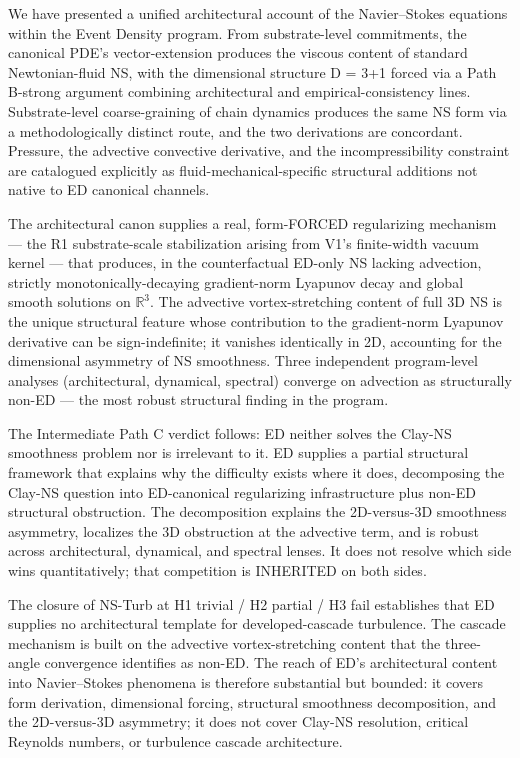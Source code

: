 \documentclass[
]{article}
\begin{document}
We have presented a unified architectural account of the Navier--Stokes
equations within the Event Density program. From substrate-level
commitments, the canonical PDE's vector-extension produces the viscous
content of standard Newtonian-fluid NS, with the dimensional structure D
= 3+1 forced via a Path B-strong argument combining architectural and
empirical-consistency lines. Substrate-level coarse-graining of chain
dynamics produces the same NS form via a methodologically distinct
route, and the two derivations are concordant. Pressure, the advective
convective derivative, and the incompressibility constraint are
catalogued explicitly as fluid-mechanical-specific structural additions
not native to ED canonical channels.

The architectural canon supplies a real, form-FORCED regularizing
mechanism --- the R1 substrate-scale stabilization arising from V1's
finite-width vacuum kernel --- that produces, in the counterfactual
ED-only NS lacking advection, strictly monotonically-decaying
gradient-norm Lyapunov decay and global smooth solutions on
\(\mathbb{R}^3\). The advective vortex-stretching content of full 3D NS
is the unique structural feature whose contribution to the gradient-norm
Lyapunov derivative can be sign-indefinite; it vanishes identically in
2D, accounting for the dimensional asymmetry of NS smoothness. Three
independent program-level analyses (architectural, dynamical, spectral)
converge on advection as structurally non-ED --- the most robust
structural finding in the program.

The Intermediate Path C verdict follows: ED neither solves the Clay-NS
smoothness problem nor is irrelevant to it. ED supplies a partial
structural framework that explains why the difficulty exists where it
does, decomposing the Clay-NS question into ED-canonical regularizing
infrastructure plus non-ED structural obstruction. The decomposition
explains the 2D-versus-3D smoothness asymmetry, localizes the 3D
obstruction at the advective term, and is robust across architectural,
dynamical, and spectral lenses. It does not resolve which side wins
quantitatively; that competition is INHERITED on both sides.

The closure of NS-Turb at H1 trivial / H2 partial / H3 fail establishes
that ED supplies no architectural template for developed-cascade
turbulence. The cascade mechanism is built on the advective
vortex-stretching content that the three-angle convergence identifies as
non-ED. The reach of ED's architectural content into Navier--Stokes
phenomena is therefore substantial but bounded: it covers form
derivation, dimensional forcing, structural smoothness decomposition,
and the 2D-versus-3D asymmetry; it does not cover Clay-NS resolution,
critical Reynolds numbers, or turbulence cascade architecture.
\end{document}
